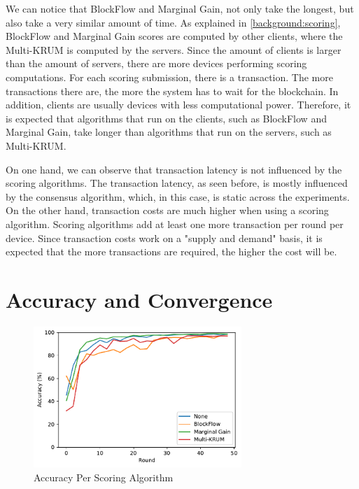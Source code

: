 We can notice that BlockFlow and Marginal Gain, not only take the longest, but also take a very similar amount of time. As explained in \autoref{background:scoring}, BlockFlow and Marginal Gain scores are computed by other clients, where the Multi-KRUM is computed by the servers. Since the amount of clients is larger than the amount of servers, there are more devices performing scoring computations. For each scoring submission, there is a transaction. The more transactions there are, the more the system has to wait for the blockchain. In addition, clients are usually devices with less computational power. Therefore, it is expected that algorithms that run on the clients, such as BlockFlow and Marginal Gain, take longer than algorithms that run on the servers, such as Multi-KRUM.

On one hand, we can observe that transaction latency is not influenced by the scoring algorithms. The transaction latency, as seen before, is mostly influenced by the consensus algorithm, which, in this case, is static across the experiments. On the other hand, transaction costs are much higher when using a scoring algorithm. Scoring algorithms add at least one more transaction per round per device. Since transaction costs work on a "supply and demand" basis, it is expected that the more transactions are required, the higher the cost will be.

\section{Accuracy and Convergence}

\begin{figure}[!ht]
    \centering
    \centering
    \includegraphics[width=0.7\textwidth]{graphics/scoring/accuracy.pdf}
    \caption{Accuracy Per Scoring Algorithm}
    \label{fig:accuracy_scoring}
\end{figure}

